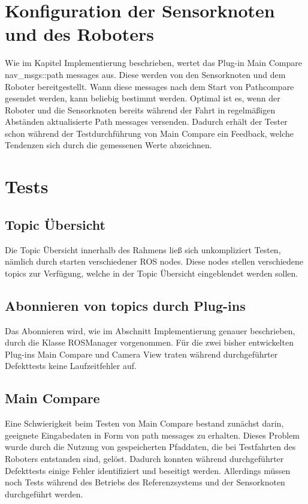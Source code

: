\section{Konfiguration der Sensorknoten und des Roboters}

Wie im Kapitel Implementierung beschrieben, wertet das Plug-in Main Compare
nav\_msgs::path messages aus. Diese werden von den Sensorknoten und dem Roboter
bereitgestellt. Wann diese messages nach dem Start von Pathcompare gesendet
werden, kann beliebig bestimmt werden. Optimal ist es, wenn der Roboter
und die Sensorknoten bereits während der Fahrt in regelmäßigen Abständen
aktualisierte Path messages versenden.  Dadurch erhält der Tester schon
während der Testdurchführung von Main Compare ein Feedback, welche Tendenzen
sich durch die gemessenen Werte abzeichnen.

\section{Tests}

\subsection{Topic Übersicht}
Die Topic Übersicht innerhalb des Rahmens ließ sich unkompliziert Testen, nämlich durch
starten verschiedener ROS nodes. Diese nodes stellen verschiedene topics zur
Verfügung, welche in der Topic Übersicht eingeblendet werden sollen.

\subsection{Abonnieren von topics durch Plug-ins}
Das Abonnieren wird, wie im Abschnitt Implementierung genauer beschrieben, durch die
Klasse ROSManager vorgenommen. Für die zwei bisher entwickelten Plug-ins Main
Compare und Camera View traten während durchgeführter Defekttests keine
Laufzeitfehler auf.

\subsection{Main Compare}
Eine Schwierigkeit beim Testen von Main Compare bestand zunächst darin,
geeignete Eingabedaten in Form von path messages zu erhalten. 
Dieses Problem wurde durch die Nutzung von gespeicherten Pfaddaten, die bei Testfahrten des
Roboters entstanden sind, gelöst. 
Dadurch konnten während durchgeführter Defekttests einige Fehler
identifiziert und beseitigt werden. Allerdings müssen noch Tests während des
Betriebs des Referenzsystems und der Sensorknoten durchgeführt werden.

